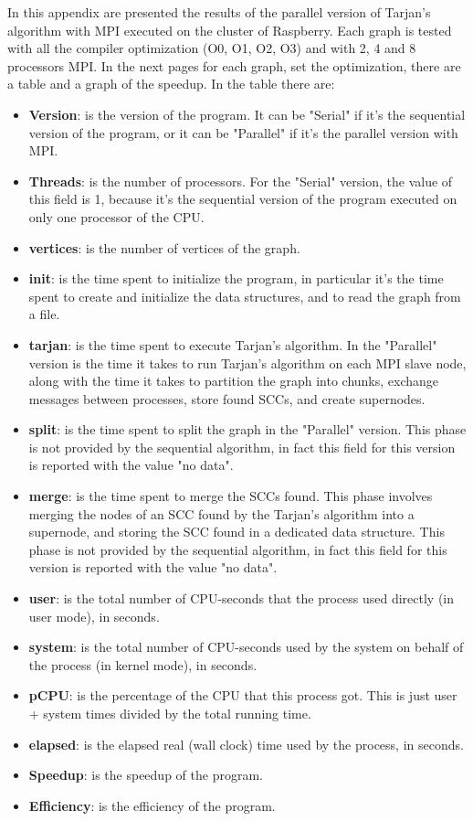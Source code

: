 In this appendix are presented the results of the parallel version of Tarjan's algorithm with MPI executed on the cluster of Raspberry.
Each graph is tested with all the compiler optimization (O0, O1, O2, O3) and with 2, 4 and 8 processors MPI.
In the next pages for each graph, set the optimization, there are a table and a graph of the speedup.
In the table there are:
\begin{itemize}
    \item \textbf{Version}: is the version of the program. It can be "Serial" if it's the sequential version of the program, or it can be "Parallel" if it's the parallel version with MPI.
    \item \textbf{Threads}: is the number of processors. For the "Serial" version, the value of this field is 1, because it's the sequential version of the program executed on only one processor of the CPU.
    \item \textbf{vertices}: is the number of vertices of the graph.
    \item \textbf{init}: is the time spent to initialize the program, in particular it's the time spent to create and initialize the data structures, and to read the graph from a file.
    \item \textbf{tarjan}: is the time spent to execute Tarjan's algorithm. In the "Parallel" version is the time it takes to run Tarjan's algorithm on each MPI slave node, along with the time it takes to partition the graph into chunks, exchange messages between processes, store found SCCs, and create supernodes.
    \item \textbf{split}: is the time spent to split the graph in the "Parallel" version. This phase is not provided by the sequential algorithm, in fact this field for this version is reported with the value "no data".
    \item \textbf{merge}: is the time spent to merge the SCCs found. This phase involves merging the nodes of an SCC found by the Tarjan's algorithm into a supernode, and storing the SCC found in a dedicated data structure.
    This phase is not provided by the sequential algorithm, in fact this field for this version is reported with the value "no data".
    \item \textbf{user}: is the total number of CPU-seconds that the process used directly (in user mode), in seconds.
    \item \textbf{system}: is the total number of CPU-seconds used by the system on behalf of the process (in kernel mode), in seconds.
    \item \textbf{pCPU}: is the percentage of the CPU that this process got. This is just user + system times divided by the total running time.
    \item \textbf{elapsed}: is the elapsed real (wall clock) time used by the process, in seconds.
    \item \textbf{Speedup}: is the speedup of the program.
    \item \textbf{Efficiency}: is the efficiency of the program. 
\end{itemize}
